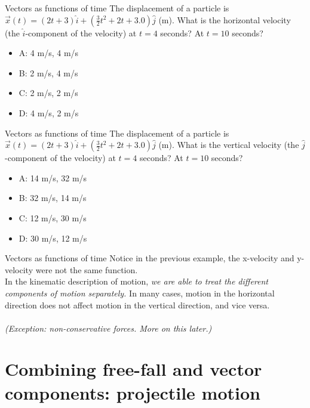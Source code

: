 \documentclass{beamer}
\begin{document}
\begin{frame}{Vectors as functions of time}
\small
The displacement of a particle is $\vec{x}(t) = (2t+3)\hat{i}+(\frac{3}{2}t^2+2t+3.0)\hat{j}$ (m).  What is the horizontal velocity (the $\hat{i}$-component of the velocity) at $t=4$ seconds?  At $t=10$ seconds?
\begin{itemize}
\item A: 4 m/s, 4 m/s
\item B: 2 m/s, 4 m/s
\item C: 2 m/s, 2 m/s
\item D: 4 m/s, 2 m/s
\end{itemize}
\end{frame}

\begin{frame}{Vectors as functions of time}
\small
The displacement of a particle is $\vec{x}(t) = (2t+3)\hat{i}+(\frac{3}{2}t^2+2t+3.0)\hat{j}$ (m).  What is the vertical velocity (the $\hat{j}$-component of the velocity) at $t=4$ seconds?  At $t=10$ seconds?
\begin{itemize}
\item A: 14 m/s, 32 m/s
\item B: 32 m/s, 14 m/s
\item C: 12 m/s, 30 m/s
\item D: 30 m/s, 12 m/s
\end{itemize}
\end{frame}

\begin{frame}{Vectors as functions of time}
Notice in the previous example, the x-velocity and y-velocity were not the same function. \\
\vspace{0.5cm}
In the kinematic description of motion, \alert{\textit{we are able to treat the different components of motion separately.}}  In many cases, motion in the horizontal direction does not affect motion in the vertical direction, and vice versa.\\
\vspace{0.5cm}
\small
{} \\
\vspace{1cm}
\textit{(Exception: non-conservative forces.  More on this later.)}
\end{frame}

\section{Combining free-fall and vector components: projectile motion}
\end{document}
